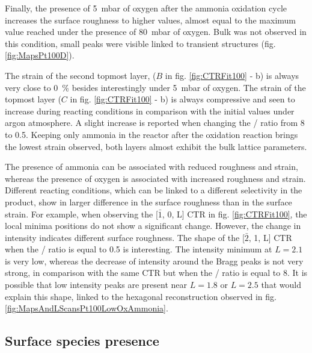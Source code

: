 Finally, the presence of \qty{5}{\milli\bar} of oxygen after the ammonia oxidation cycle increases the surface roughness to higher values, almost equal to the maximum value reached under the presence of \qty{80}{\milli\bar} of oxygen.
Bulk  was not observed in this condition, small peaks were visible linked to transient structures (fig. \ref{fig:MapsPt100D}).

The strain of the second topmost layer, ($B$ in fig. \ref{fig:CTRFit100} - b) is always very close to \qty{0}{\percent} besides interestingly under \qty{5}{\milli\bar} of oxygen.
The strain of the topmost layer ($C$ in fig. \ref{fig:CTRFit100} - b) is always compressive and seen to increase during reacting conditions in comparison with the initial values under argon atmosphere.
A slight increase is reported when changing the / ratio from \num{8} to \num{0.5}.
Keeping only ammonia in the reactor after the oxidation reaction brings the lowest strain observed, both layers almost exhibit the bulk lattice parameters.

The presence of ammonia can be associated with reduced roughness and strain, whereas the presence of oxygen is associated with increased roughness and strain.
Different reacting conditions, which can be linked to a different selectivity in the product, show in larger difference in the surface roughness than in the surface strain.
For example, when observing the [$\bar{1}$, 0, L] CTR in fig. \ref{fig:CTRFit100}, the local minima positions do not show a significant change.
However, the change in intensity indicates different surface roughness.
The shape of the [$\bar{2}$, 1, L] CTR when the / ratio is equal to \num{0.5} is interesting.
The intensity minimum at $L=2.1$ is very low, whereas the decrease of intensity around the Bragg peaks is not very strong, in comparison with the same CTR but when the / ratio is equal to \num{8}.
It is possible that low intensity peaks are present near $L=1.8$ or $L=2.5$ that would explain this shape, linked to the hexagonal reconstruction observed in fig. \ref{fig:MapsAndLScansPt100LowOxAmmonia}.

\subsection{Surface species presence}

